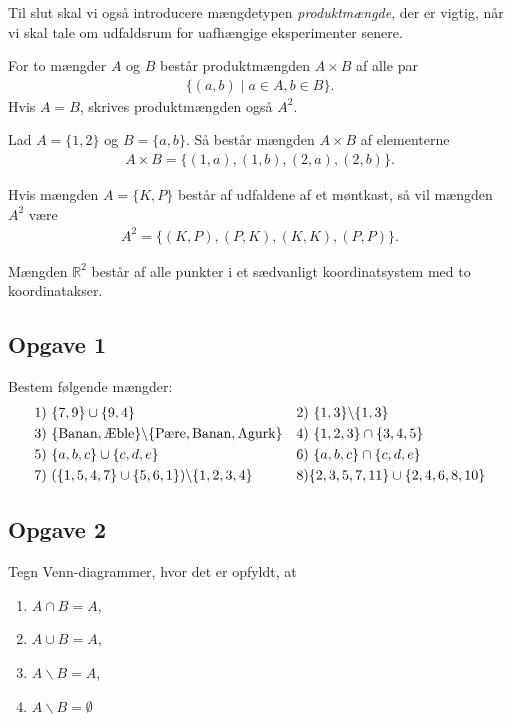 Til slut skal vi også introducere mængdetypen \textit{produktmængde}, der er vigtig, når vi skal tale om udfaldsrum for uafhængige eksperimenter senere. 
\begin{defn}[Produktmængde]
For to mængder $A$ og $B$ består produktmængden $A \times B$ af alle par
\begin{align*}
	\{(a,b) \mid a\in A, b \in B\}.
\end{align*}
Hvis $A = B$, skrives produktmængden også $A^2$.
\end{defn}
\begin{exa}
	Lad $A = \{1,2\}$ og $B = \{a,b\}$. Så består mængden $A \times B$ af elementerne
	\begin{align*}
		A \times B = \{(1,a),(1,b),(2,a),(2,b)\}.
	\end{align*}
\end{exa}
\begin{exa}
	Hvis mængden $A = \{K,P\}$ består af udfaldene af et møntkast, så vil mængden $A^2$ være
	\begin{align*}
		A^2 = \{(K,P),(P,K),(K,K),(P,P)\}.
	\end{align*}
\end{exa}
\begin{exa}
	Mængden $\mathbb{R}^2$ består af alle punkter i et sædvanligt koordinatsystem med to koordinatakser. 
\end{exa}

\subsection*{Opgave 1}
Bestem følgende mængder:
\begin{align*}
&1) \ \{7,9\} \cup \{9,4\}  &&2) \ \{1,3\} \backslash \{1,3\}    \\
&3) \ \{\textnormal{Banan},\textnormal{Æble}\} \backslash \{\textnormal{Pære},\textnormal{Banan},\textnormal{Agurk}\} &&4) \ \{1,2,3\} \cap \{3,4,5\}  \\
&5) \ \{a,b,c\} \cup \{c,d,e\}  &&6) \ \{a,b,c\} \cap \{c,d,e\}   \\
&7) \ (\{1,5,4,7 \} \cup \{5,6,1\}) \backslash \{1,2,3,4\}  &&8) \{2,3,5,7,11\} \cup \{2,4,6,8,10\}
\end{align*}
\subsection*{Opgave 2}
Tegn Venn-diagrammer, hvor det er opfyldt, at 
\begin{enumerate}[label = \roman*)]
	\item $A \cap B = A$,
	\item $A \cup B = A$,
	\item $A \backslash B = A$,
	\item $A \backslash B = \emptyset$
\end{enumerate}

